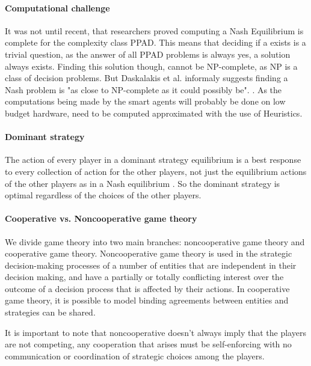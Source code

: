 \paragraph{Computational challenge} 
It was not until recent, that researchers proved computing a Nash Equilibrium is complete for the complexity class PPAD\cite{daskalakis2009complexity}. This means that deciding if a  exists is a trivial question, as the answer of all PPAD problems is always yes, a solution always exists. Finding this solution though, cannot be NP-complete, as NP is a class of decision problems. But Daskalakis et al. informaly suggests finding a Nash problem is "as close to NP-complete as it could possibly be". \cite{daskalakis2009complexity}. 
As the computations being made by the smart agents will probably be done on low budget hardware,  need to be computed approximated with the use of Heuristics. \cite{MicrogridModellingPetrosAristidou,AumannGameTheoryAccomplish} 


\paragraph{Dominant strategy} 
The action of every player in a dominant strategy equilibrium is a best response to every collection of action for the other players, not just the equilibrium actions of the other players as in a Nash equilibrium \cite{CourseInGameTheory}. So the dominant strategy is optimal regardless of the choices of the other players.

\paragraph{Cooperative vs. Noncooperative game theory} 
We divide game theory into two main branches: noncooperative game theory and cooperative game theory. Noncooperative game theory is used in the strategic decision-making processes of a number of entities that are independent in their decision making, and have a partially or totally conflicting interest over the outcome of a decision process that is affected by their actions\cite{keypaper}. In cooperative game theory, it is possible to model binding agreements between entities and strategies can be shared. 

It is important to note that noncooperative doesn't always imply that the players are not competing, any cooperation that arises must be self-enforcing with no communication or coordination of strategic choices among the players.\cite{keypaper}


